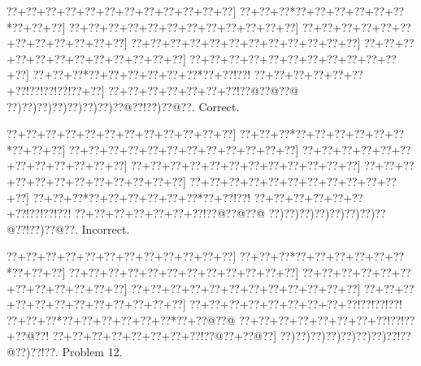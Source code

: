 \documentclass[a5paper]{article}
\begin{document}
\begin{center}
{\goo
\0??+\0??+\0??+\0??+\0??+\0??+\0??+\0??+\0??+\0??+\0??+\0??]
\0??+\0??+\0??*\0??+\0??+\0??+\0??+\0??+\0??*\0??+\0??+\0??]
\0??+\0??+\0??+\0??+\0??+\0??+\0??+\0??+\0??+\0??+\0??+\0??]
\0??+\0??+\0??+\0??+\0??+\0??+\0??+\0??+\0??+\0??+\0??+\0??]
\0??+\0??+\0??+\0??+\0??+\0??+\0??+\0??+\0??+\0??+\0??+\0??]
\0??+\0??+\0??+\0??+\0??+\0??+\0??+\0??+\0??+\0??+\0??+\0??]
\0??+\0??+\0??+\0??+\0??+\0??+\0??+\0??+\0??+\0??+\0??+\0??]
\0??+\0??+\0??*\0??+\0??+\0??+\0??+\0??+\0??*\0??+\0??!\0??!
\0??+\0??+\0??+\0??+\0??+\0??+\0??!\0??!\0??!\0??!\0??+\0??]
\0??+\0??+\0??+\0??+\0??+\0??+\0??!\0??@\0??@\0??@
\0??)\0??)\0??)\0??)\0??)\0??)\0??)\0??@\0??!\0??)\0??@\0??.
}
Correct. 

\end{center}
\begin{center}
{\goo
\0??+\0??+\0??+\0??+\0??+\0??+\0??+\0??+\0??+\0??+\0??+\0??]
\0??+\0??+\0??*\0??+\0??+\0??+\0??+\0??+\0??*\0??+\0??+\0??]
\0??+\0??+\0??+\0??+\0??+\0??+\0??+\0??+\0??+\0??+\0??+\0??]
\0??+\0??+\0??+\0??+\0??+\0??+\0??+\0??+\0??+\0??+\0??+\0??]
\0??+\0??+\0??+\0??+\0??+\0??+\0??+\0??+\0??+\0??+\0??+\0??]
\0??+\0??+\0??+\0??+\0??+\0??+\0??+\0??+\0??+\0??+\0??+\0??]
\0??+\0??+\0??+\0??+\0??+\0??+\0??+\0??+\0??+\0??+\0??+\0??]
\0??+\0??+\0??*\0??+\0??+\0??+\0??+\0??+\0??*\0??+\0??!\0??!
\0??+\0??+\0??+\0??+\0??+\0??+\0??!\0??!\0??!\0??!
\0??+\0??+\0??+\0??+\0??+\0??+\0??!\0??@\0??@\0??@
\0??)\0??)\0??)\0??)\0??)\0??)\0??)\0??@\0??!\0??)\0??@\0??.
}
Incorrect. 

\end{center}
\newpage
\begin{center}
{\goo
\0??+\0??+\0??+\0??+\0??+\0??+\0??+\0??+\0??+\0??+\0??+\0??]
\0??+\0??+\0??*\0??+\0??+\0??+\0??+\0??+\0??*\0??+\0??+\0??]
\0??+\0??+\0??+\0??+\0??+\0??+\0??+\0??+\0??+\0??+\0??+\0??]
\0??+\0??+\0??+\0??+\0??+\0??+\0??+\0??+\0??+\0??+\0??+\0??]
\0??+\0??+\0??+\0??+\0??+\0??+\0??+\0??+\0??+\0??+\0??+\0??]
\0??+\0??+\0??+\0??+\0??+\0??+\0??+\0??+\0??+\0??+\0??+\0??]
\0??+\0??+\0??+\0??+\0??+\0??+\0??+\0??+\0??!\0??!\0??!\0??!
\0??+\0??+\0??*\0??+\0??+\0??+\0??+\0??+\0??*\0??+\0??@\0??@
\0??+\0??+\0??+\0??+\0??+\0??+\0??+\0??!\0??!\0??+\0??@\0??!
\0??+\0??+\0??+\0??+\0??+\0??+\0??+\0??!\0??@\0??+\0??@\0??]
\0??)\0??)\0??)\0??)\0??)\0??)\0??)\0??!\0??@\0??)\0??!\0??.
}
Problem 12.

\end{center}
\end{document}
